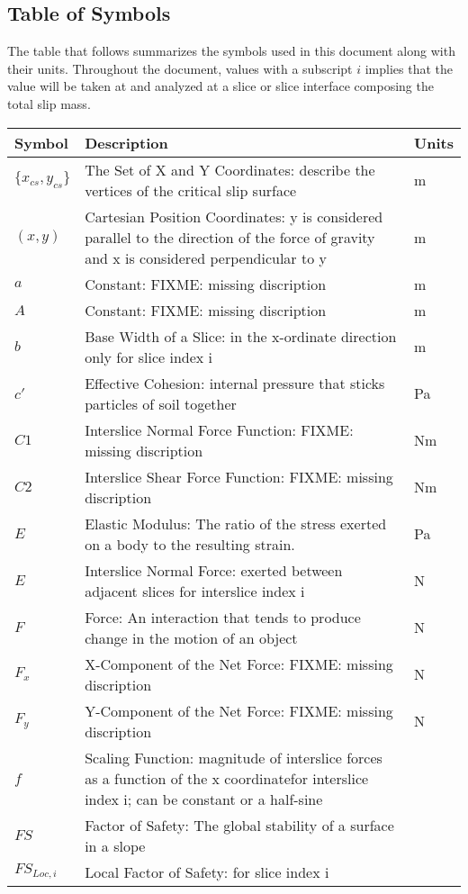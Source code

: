 \documentclass[12pt]{article}
\begin{document}
\subsection{Table of Symbols}
\label{Sec:ToS}
The table that follows summarizes the symbols used in this document along with their units. Throughout the document, values with a subscript $i$ implies that the value will be taken at and analyzed at a slice or slice interface composing the total slip mass.
\begin{longtabu}{l X[l] l}
\toprule
Symbol & Description & Units
\\
\midrule
$\{{x_{cs}}{,y_{cs}}\}$ & The Set of X and Y Coordinates: describe the vertices of the critical slip surface & m
\\
$(x,y)$ & Cartesian Position Coordinates: y is considered parallel to the direction of the force of gravity and x is considered perpendicular to y & m
\\
$a$ & Constant: FIXME: missing discription & m
\\
$A$ & Constant: FIXME: missing discription & m
\\
$b$ & Base Width of a Slice: in the x-ordinate direction only for slice index i & m
\\
$c'$ & Effective Cohesion: internal pressure that sticks particles of soil together & Pa
\\
$C1$ & Interslice Normal Force Function: FIXME: missing discription & Nm
\\
$C2$ & Interslice Shear Force Function: FIXME: missing discription & Nm
\\
$E$ & Elastic Modulus: The ratio of the stress exerted on a body to the resulting strain. & Pa
\\
$E$ & Interslice Normal Force: exerted between adjacent slices for interslice index i & N
\\
$F$ & Force: An interaction that tends to produce change in the motion of an object & N
\\
${F_{x}}$ & X-Component of the Net Force: FIXME: missing discription & N
\\
${F_{y}}$ & Y-Component of the Net Force: FIXME: missing discription & N
\\
$f$ & Scaling Function: magnitude of interslice forces as a function of the x coordinatefor interslice index i; can be constant or a half-sine & 
\\
$FS$ & Factor of Safety: The global stability of a surface in a slope & 
\\
${FS_{Loc,i}}$ & Local Factor of Safety: for slice index i & 

\end{longtabu}
\end{document}
